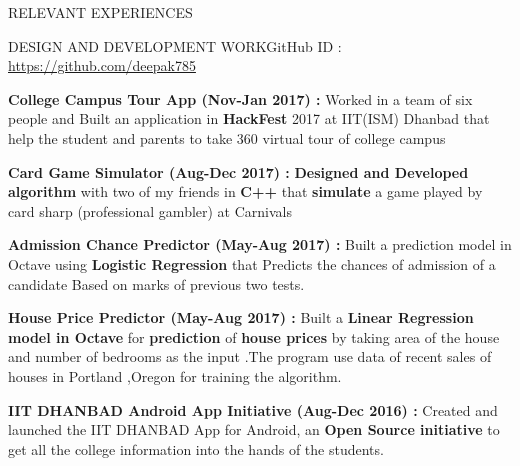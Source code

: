 \documentclass{resume} %
\begin{document}
\begin{rSection}{RELEVANT EXPERIENCES}
\begin{rSubsection}{DESIGN AND DEVELOPMENT WORK}{}{GitHub ID : \url{https://github.com/deepak785}}{}
\item \textbf{College Campus Tour App (Nov-Jan 2017) :}
Worked in a team of six people and Built an application in \textbf{HackFest} 2017 at IIT(ISM) Dhanbad that help the student and parents to take 360 virtual tour of college campus 
\item \textbf{Card Game Simulator (Aug-Dec 2017) :} \textbf{Designed and Developed algorithm }with two of my friends in \textbf{C++} that \textbf{simulate} a game played by card sharp (professional gambler) at Carnivals
\item \textbf{Admission Chance Predictor (May-Aug 2017) :} Built a prediction model in Octave using \textbf{Logistic Regression} that Predicts the chances of  admission of a candidate Based on marks of previous two tests.
\item \textbf{House Price Predictor (May-Aug 2017) :} Built a \textbf{Linear Regression model in Octave} for \textbf{prediction} of \textbf{house prices} by taking area of the house and number of bedrooms as the input .The program use data of recent sales of houses in Portland ,Oregon for training the algorithm. 
\item \textbf{IIT DHANBAD Android App Initiative (Aug-Dec 2016) : } Created and launched the IIT DHANBAD App for Android, an \textbf{Open Source initiative} to get all the college information into the hands of the students.
\end{rSubsection}
\end{rSection}






\end{document}
